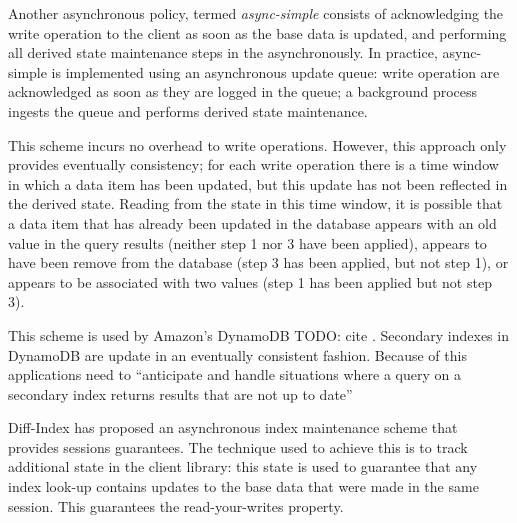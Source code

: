 Another asynchronous policy, termed \textit{async-simple} consists of acknowledging the write operation to the client as
soon as the base data is updated, and performing all derived state maintenance steps in the asynchronously.
In practice, async-simple is implemented using an asynchronous update queue: write operation are acknowledged as soon
as they are logged in the queue; a background process ingests the queue and performs derived state maintenance.

This scheme incurs no overhead to write operations.
However, this approach only provides eventually consistency;
for each write operation there is a time window in which a data item has been updated, but this update has not been
reflected in the derived state.
Reading from the state in this time window, it is possible that a data item that has already been updated in the database
appears with an old value in the query results (neither step 1 nor 3 have been applied), appears to have been remove
from the database (step 3 has been applied, but not step 1), or appears to be associated with two values (step 1 has
been applied but not step 3).

This scheme is used by Amazon's DynamoDB
TODO: cite
.
Secondary indexes in DynamoDB are update in an eventually consistent fashion.
Because of this applications need to
``anticipate and handle situations where a query on a secondary index returns results that are not up to date''

Diff-Index \cite{tan:diffindex} has proposed an asynchronous index maintenance scheme that provides sessions guarantees.
The technique used to achieve this is to track additional state in the client library:
this state is used to guarantee that any index look-up contains updates to the base data that were made in the same
session.
This guarantees the read-your-writes property.





